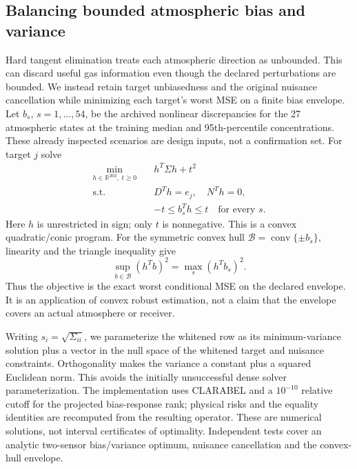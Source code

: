 \documentclass[conference]{IEEEtran}
\begin{document}
\subsection{Balancing bounded atmospheric bias and variance}
Hard tangent elimination treats each atmospheric direction as unbounded. This can discard useful gas information even though the declared perturbations are bounded. We instead retain target unbiasedness and the original nuisance cancellation while minimizing each target's worst MSE on a finite bias envelope. Let $b_s$, $s=1,\ldots,54$, be the archived nonlinear discrepancies for the 27 atmospheric states at the training median and 95th-percentile concentrations. These already inspected scenarios are design inputs, not a confirmation set. For target $j$ solve
\begin{equation}
\begin{aligned}
\min_{h\in\mathbb R^{202},\;t\geq0}\quad & h^T\Sigma h+t^2\\
\text{s.t.}\quad&D^Th=e_j,\quad N^Th=0,\\
&-t\leq b_s^Th\leq t\quad\text{for every }s.
\end{aligned}
\label{eq:boundedbias}
\end{equation}
Here $h$ is unrestricted in sign; only $t$ is nonnegative. This is a convex quadratic/conic program. For the symmetric convex hull $\mathcal B=\operatorname{conv}\{\pm b_s\}$, linearity and the triangle inequality give
\[
\sup_{b\in\mathcal B}(h^Tb)^2=\max_s(h^Tb_s)^2.
\]
Thus the objective is the exact worst conditional MSE on the declared envelope. It is an application of convex robust estimation, not a claim that the envelope covers an actual atmosphere or receiver.

Writing $s_i=\sqrt{\Sigma_{ii}}$, we parameterize the whitened row as its minimum-variance solution plus a vector in the null space of the whitened target and nuisance constraints. Orthogonality makes the variance a constant plus a squared Euclidean norm. This avoids the initially unsuccessful dense solver parameterization. The implementation uses CLARABEL and a $10^{-10}$ relative cutoff for the projected bias-response rank; physical risks and the equality identities are recomputed from the resulting operator. These are numerical solutions, not interval certificates of optimality. Independent tests cover an analytic two-sensor bias/variance optimum, nuisance cancellation and the convex-hull envelope.
\end{document}

